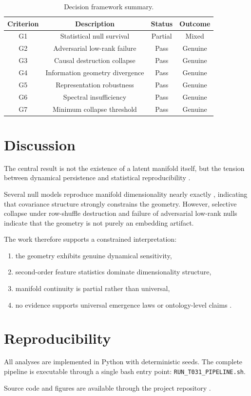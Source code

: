 \documentclass[
reprint,
superscriptaddress,
amsmath,
amssymb,
aps,
chaos
]{revtex4-2}
\begin{document}
\begin{table}[t]
\caption{Decision framework summary.}
\begin{ruledtabular}
\begin{tabular}{cccc}
Criterion & Description & Status & Outcome \\
\hline
G1 & Statistical null survival & Partial & Mixed \\
G2 & Adversarial low-rank failure & Pass & Genuine \\
G3 & Causal destruction collapse & Pass & Genuine \\
G4 & Information geometry divergence & Pass & Genuine \\
G5 & Representation robustness & Pass & Genuine \\
G6 & Spectral insufficiency & Pass & Genuine \\
G7 & Minimum collapse threshold & Pass & Genuine \\
\end{tabular}
\end{ruledtabular}
\label{tab:framework}
\end{table}

\section{Discussion}

The central result is not the existence of a latent manifold itself, but the tension between dynamical persistence and statistical reproducibility \cite{schreiber1999interdisciplinary, kantz1997nonlinear}.

Several null models reproduce manifold dimensionality nearly exactly \cite{donoho2000intrinsic}, indicating that covariance structure strongly constrains the geometry. However, selective collapse under row-shuffle destruction \cite{crutchfield1986equivalence} and failure of adversarial low-rank nulls \cite{costa2007intrinsic} indicate that the geometry is not purely an embedding artifact.

The work therefore supports a constrained interpretation:
\begin{enumerate}
\item the geometry exhibits genuine dynamical sensitivity,
\item second-order feature statistics dominate dimensionality structure,
\item manifold continuity is partial rather than universal,
\item no evidence supports universal emergence laws or ontology-level claims \cite{tononi2008consciousness}.
\end{enumerate}

\section{Reproducibility}

All analyses are implemented in Python with deterministic seeds.
The complete pipeline is executable through a single bash entry point:
\texttt{RUN\_T031\_PIPELINE.sh}.

Source code and figures are available through the project repository \cite{kutz2017dynamic}.



\end{document}
